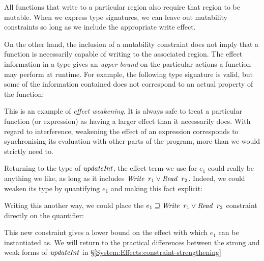 All functions that write to a particular region also require that region to be mutable. When we express type signatures, we can leave out mutability constraints so long as we include the appropriate write effect. 

On the other hand, the inclusion of a mutability constraint does not imply that a function is necessarily capable of writing to the associated region. The effect information in a type gives an \emph{upper bound} on the particular actions a function may perform at runtime. For example, the following type signature is valid, but some of the information contained does not correspond to an actual property of the function:


This is an example of \emph{effect weakening}. It is always safe to treat a particular function (or expression) as having a larger effect than it necessarily does. With regard to interference, weakening the effect of an expression corresponds to synchronising its evaluation with other parts of the program, more than we would strictly need to.

Returning to the type of $\operatorname{\mathit{updateInt}}$, the effect term we use for $e_1$ could really be anything we like, as long as it includes $\operatorname{\mathit{Write}} \ r_1 \lor \operatorname{\mathit{Read}} \ r_2$. Indeed, we could weaken its type by quantifying $e_1$ and making this fact explicit:


Writing this another way, we could place the $e_1 \sqsupseteq \iWrite \ r_1 \lor \iRead \ r_2$ constraint directly on the quantifier:


This new constraint gives a lower bound on the effect with which $e_1$ can be instantiated as. We will return to the practical differences between the strong and weak forms of $\operatorname{\mathit{updateInt}}$ in \S\ref{System:Effects:constraint-strengthening}

